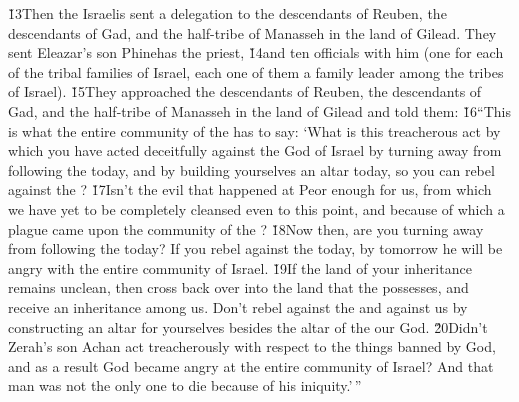 \v{13}Then the Israelis sent a delegation to the descendants of Reuben, the descendants of Gad, and the half-tribe of Manasseh in the land of Gilead. They sent Eleazar's son Phinehas the priest, \v{14}and ten officials with him (one for each of the tribal families of Israel, each one of them a family leader among the tribes of Israel). \v{15}They approached the descendants of Reuben, the descendants of Gad, and the half-tribe of Manasseh in the land of Gilead and told them: \v{16}``This is what the entire community of the  has to say: `What is this treacherous act by which you have acted deceitfully against the God of Israel by turning away from following the  today, and by building yourselves an altar today, so you can rebel against the ? \v{17}Isn't the evil that happened at Peor enough for us, from which we have yet to be completely cleansed even to this point, and because of which a plague came upon the community of the ? \v{18}Now then, are you turning away from following the  today? If you rebel against the  today, by tomorrow he will be angry with the entire community of Israel. \v{19}If the land of your inheritance remains unclean, then cross back over into the land that the  possesses, and receive an inheritance among us. Don't rebel against the  and against us by constructing an altar for yourselves besides the altar of the  our God. \v{20}Didn't Zerah's son Achan act treacherously with respect to the things banned by God, and as a result God became angry at the entire community of Israel? And that man was not the only one to die because of his iniquity.'\,''

